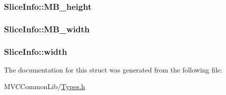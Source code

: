 \label{struct_slice_info_a59f3f9af4b4127485b3ea3fc79e0d968}
\hypertarget{struct_slice_info_ad1009bbd0e253ed3320cb701ea06ce34}{
\subsubsection[{MB\_\-height}]{ {\bf SliceInfo::MB\_\-height}}}
\label{struct_slice_info_ad1009bbd0e253ed3320cb701ea06ce34}
\hypertarget{struct_slice_info_aaa2d842c5178a57edc75a4830eeaa08a}{
\subsubsection[{MB\_\-width}]{ {\bf SliceInfo::MB\_\-width}}}
\label{struct_slice_info_aaa2d842c5178a57edc75a4830eeaa08a}
\hypertarget{struct_slice_info_ac8546df1212147ac6843f4ee90150a42}{
\subsubsection[{width}]{ {\bf SliceInfo::width}}}
\label{struct_slice_info_ac8546df1212147ac6843f4ee90150a42}


The documentation for this struct was generated from the following file:\begin{DoxyCompactItemize}
\item 
MVCCommonLib/\hyperlink{_types_8h}{Types.h}\end{DoxyCompactItemize}
